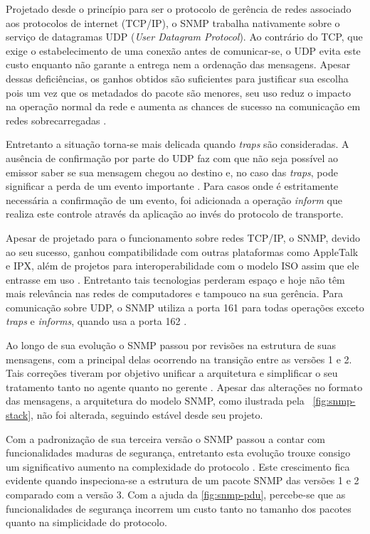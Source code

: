 \documentclass[twoside,english,brazilian]{UNISINOSmonografia}
\begin{document}
Projetado desde o princípio para ser o protocolo de gerência de redes 
associado aos protocolos de internet (TCP/IP), o SNMP trabalha nativamente 
sobre o serviço de datagramas UDP (\textit{User Datagram Protocol}).
Ao contrário do TCP, que exige o estabelecimento de uma conexão antes de 
comunicar-se, o UDP evita este custo enquanto não garante a entrega nem 
a ordenação das mensagens.
Apesar dessas deficiências, os ganhos obtidos são suficientes para justificar 
sua escolha pois um vez que os metadados do pacote são menores, seu uso reduz 
o impacto na operação normal da rede e aumenta as chances de sucesso na 
comunicação em redes sobrecarregadas \cite{Mauro2009}.


Entretanto a situação torna-se mais delicada quando \textit{traps} são 
consideradas. 
A ausência de confirmação por parte do UDP faz com que não seja possível ao 
emissor saber se sua mensagem chegou ao destino e, no caso das \textit{traps}, 
pode significar a perda de um evento importante \cite{Clemm2006}.
Para casos onde é estritamente necessária a confirmação de um evento, foi 
adicionada a operação \textit{inform} que realiza este controle através da 
aplicação ao invés do protocolo de transporte.


Apesar de projetado para o funcionamento sobre redes TCP/IP, o SNMP, devido ao 
seu sucesso, ganhou compatibilidade com outras plataformas como AppleTalk e 
IPX, além de projetos para interoperabilidade com o modelo ISO 
assim que ele entrasse em uso \cite{Hunt1997}.
Entretanto tais tecnologias perderam espaço e hoje não têm mais relevância nas 
redes de computadores e tampouco na sua gerência.
Para comunicação sobre UDP, o SNMP utiliza a porta 161 para todas operações 
exceto \textit{traps} e \textit{informs}, quando usa a porta 162 
\cite{Mauro2009}.


Ao longo de sua evolução o SNMP passou por revisões na estrutura de suas 
mensagens, com a principal delas ocorrendo na transição entre as versões 1 e 2.
Tais correções tiveram por objetivo unificar a arquitetura e 
simplificar o seu tratamento tanto no agente quanto no gerente 
\cite{perkins1997understanding}.
Apesar das alterações no formato das mensagens, a arquitetura do modelo SNMP, 
como ilustrada pela ~\autoref{fig:snmp-stack}, não foi alterada, 
seguindo estável desde seu projeto.


Com a padronização de sua terceira versão o SNMP passou a contar com 
funcionalidades maduras de segurança, entretanto esta evolução trouxe 
consigo um significativo aumento na complexidade do protocolo
\cite{Mauro2009}.
Este crescimento fica evidente quando inspeciona-se a estrutura de um pacote 
SNMP das versões 1 e 2 comparado com a versão 3.
Com a ajuda da \autoref{fig:snmp-pdu}, percebe-se que as funcionalidades de 
segurança incorrem um custo tanto no tamanho dos pacotes quanto na 
simplicidade do protocolo.
\end{document}
